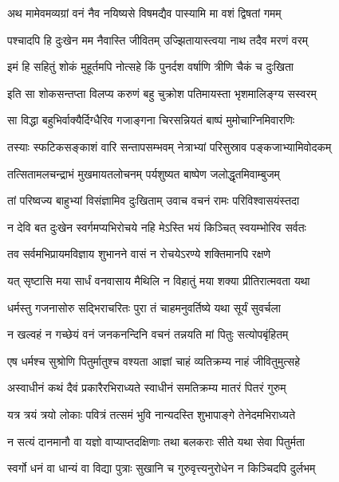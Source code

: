 \twolineshloka
{अथ मामेवमव्यग्रां वनं नैव नयिष्यसे}
{विषमद्यैव पास्यामि मा वशं द्विषतां गमम्} %

\twolineshloka
{पश्चादपि हि दुःखेन मम नैवास्ति जीवितम्}
{उज्झितायास्त्वया नाथ तदैव मरणं वरम्} %

\twolineshloka
{इमं हि सहितुं शोकं मुहूर्तमपि नोत्सहे}
{किं पुनर्दश वर्षाणि त्रीणि चैकं च दुःखिता} %

\twolineshloka
{इति सा शोकसन्तप्ता विलप्य करुणं बहु}
{चुक्रोश पतिमायस्ता भृशमालिङ्ग्य सस्वरम्} %

\twolineshloka
{सा विद्धा बहुभिर्वाक्यैर्दिग्धैरिव गजाङ्गना}
{चिरसन्नियतं बाष्पं मुमोचाग्निमिवारणिः} %

\twolineshloka
{तस्याः स्फटिकसङ्काशं वारि सन्तापसम्भवम्}
{नेत्राभ्यां परिसुस्राव पङ्कजाभ्यामिवोदकम्} %

\twolineshloka
{तत्सितामलचन्द्राभं मुखमायतलोचनम्}
{पर्यशुष्यत बाष्पेण जलोद्धृतमिवाम्बुजम्} %

\twolineshloka
{तां परिष्वज्य बाहुभ्यां विसंज्ञामिव दुःखिताम्}
{उवाच वचनं रामः परिविश्वासयंस्तदा} %

\twolineshloka
{न देवि बत दुःखेन स्वर्गमप्यभिरोचये}
{नहि मेऽस्ति भयं किञ्चित् स्वयम्भोरिव सर्वतः} %

\twolineshloka
{तव सर्वमभिप्रायमविज्ञाय शुभानने}
{वासं न रोचयेऽरण्ये शक्तिमानपि रक्षणे} %

\twolineshloka
{यत् सृष्टासि मया सार्धं वनवासाय मैथिलि}
{न विहातुं मया शक्या प्रीतिरात्मवता यथा} %

\twolineshloka
{धर्मस्तु गजनासोरु सद्भिराचरितः पुरा}
{तं चाहमनुवर्तिष्ये यथा सूर्यं सुवर्चला} %

\twolineshloka
{न खल्वहं न गच्छेयं वनं जनकनन्दिनि}
{वचनं तन्नयति मां पितुः सत्योपबृंहितम्} %

\twolineshloka
{एष धर्मश्च सुश्रोणि पितुर्मातुश्च वश्यता}
{आज्ञां चाहं व्यतिक्रम्य नाहं जीवितुमुत्सहे} %

\twolineshloka
{अस्वाधीनं कथं दैवं प्रकारैरभिराध्यते}
{स्वाधीनं समतिक्रम्य मातरं पितरं गुरुम्} %

\twolineshloka
{यत्र त्रयं त्रयो लोकाः पवित्रं तत्समं भुवि}
{नान्यदस्ति शुभापाङ्गे तेनेदमभिराध्यते} %

\twolineshloka
{न सत्यं दानमानौ वा यज्ञो वाप्याप्तदक्षिणाः}
{तथा बलकराः सीते यथा सेवा पितुर्मता} %

\twolineshloka
{स्वर्गो धनं वा धान्यं वा विद्या पुत्राः सुखानि च}
{गुरुवृत्त्यनुरोधेन न किञ्चिदपि दुर्लभम्} %

